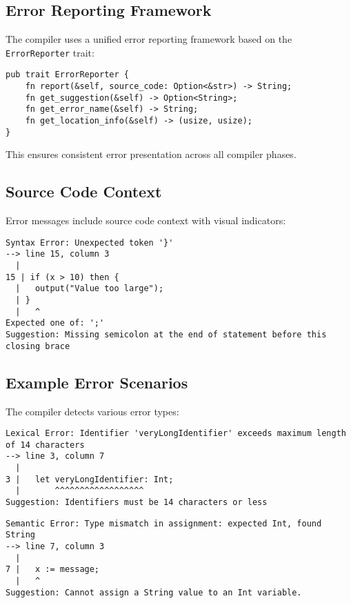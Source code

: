 \documentclass[12pt,a4paper]{article}
\begin{document}
\subsection{Error Reporting Framework}
The compiler uses a unified error reporting framework based on the \texttt{ErrorReporter} trait:

\begin{lstlisting}[caption={Error Reporter Interface}]
pub trait ErrorReporter {
    fn report(&self, source_code: Option<&str>) -> String;
    fn get_suggestion(&self) -> Option<String>;
    fn get_error_name(&self) -> String;
    fn get_location_info(&self) -> (usize, usize);
}
\end{lstlisting}

This ensures consistent error presentation across all compiler phases.

\subsection{Source Code Context}
Error messages include source code context with visual indicators:

\begin{lstlisting}[caption={Error with Source Context}]
Syntax Error: Unexpected token '}'
--> line 15, column 3
  |
15 | if (x > 10) then {
  |   output("Value too large");
  | }
  |   ^
Expected one of: ';'
Suggestion: Missing semicolon at the end of statement before this closing brace
\end{lstlisting}

\subsection{Example Error Scenarios}
The compiler detects various error types:

\begin{lstlisting}[caption={Lexical Error Example}]
Lexical Error: Identifier 'veryLongIdentifier' exceeds maximum length of 14 characters
--> line 3, column 7
  |
3 |   let veryLongIdentifier: Int;
  |       ^^^^^^^^^^^^^^^^^^
Suggestion: Identifiers must be 14 characters or less
\end{lstlisting}

\begin{lstlisting}[caption={Semantic Error Example}]
Semantic Error: Type mismatch in assignment: expected Int, found String
--> line 7, column 3
  |
7 |   x := message;
  |   ^
Suggestion: Cannot assign a String value to an Int variable.
\end{lstlisting}
\end{document}
